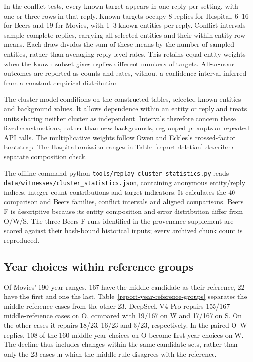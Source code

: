 \documentclass[10pt,a4paper]{article}
\begin{document}
In the conflict tests, every known target appears in one reply per setting, with one or three
rows in that reply. Known targets occupy 8 replies for Hospital, 6--16 for Beers and 19 for
Movies, with 1--3 known entities per reply. Conflict intervals sample complete replies,
carrying all selected entities and their within-entity row means. Each draw divides the
sum of these means by the number of sampled entities, rather than averaging reply-level
rates. This retains equal entity weights when the known subset gives replies different
numbers of targets. All-or-none outcomes are reported as counts and rates, without a
confidence interval inferred from a constant empirical distribution.

The cluster model conditions on the constructed tables, selected known entities and background
values. It allows dependence within an entity or reply and treats units sharing neither
cluster as independent. Intervals therefore concern these fixed constructions, rather than
new backgrounds, regrouped prompts or repeated API calls. The multiplicative weights follow
\href{https://doi.org/10.1214/12-AOAS547}{Owen and Eckles's crossed-factor bootstrap}.
The Hospital omission ranges in Table~\ref{report-deletion} describe a separate composition check.

The offline command {\ttfamily\small python} {\small\nolinkurl{tools/replay_cluster_statistics.py}}
reads {\small\nolinkurl{data/witnesses/cluster_statistics.json}}, containing anonymous
entity/reply indices, integer count contributions and target indicators. It calculates the
40-comparison and Beers families, conflict intervals and aligned comparisons. Beers F is
descriptive because its entity composition and error distribution differ from O/W/S.
The three Beers F runs identified in the provenance supplement are scored against their
hash-bound historical inputs; every archived chunk count is reproduced.

\subsection{Year choices within reference groups}\label{report-year-groups}

Of Movies' 190 year ranges, 167 have the middle candidate as their reference, 22 have the
first and one the last. Table~\ref{report-year-reference-groups} separates the middle-reference
cases from the other 23. DeepSeek-V4-Pro repairs 155/167 middle-reference cases on O,
compared with 19/167 on W and 17/167 on S. On the other cases it repairs 18/23, 16/23 and
8/23, respectively. In the paired O--W replies, 108 of the 160 middle-year choices on O
become first-year choices on W. The decline thus includes changes within the same candidate
sets, rather than only the 23 cases in which the middle rule disagrees with the reference.
\end{document}
